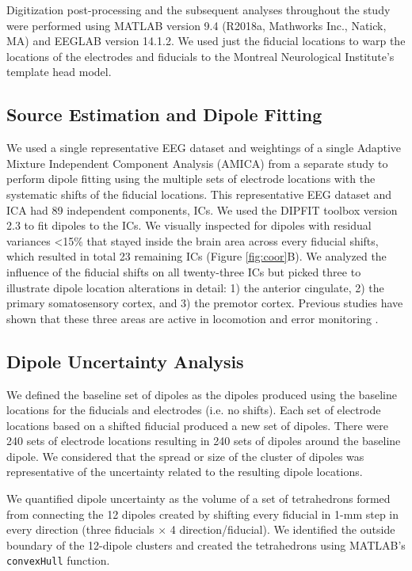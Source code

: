 \documentclass{UCF_ETD}
\begin{document}
Digitization post-processing and the subsequent analyses throughout the study were performed using MATLAB version 9.4 (R2018a, Mathworks Inc., Natick, MA) and EEGLAB \cite{Delorme2004-yy} version 14.1.2. We used just the fiducial locations to warp the locations of the electrodes and fiducials to the Montreal Neurological Institute's template head model.

\subsection{Source Estimation and Dipole Fitting}
We used a single representative EEG dataset and weightings of a single Adaptive Mixture Independent Component Analysis (AMICA) from a separate study to perform dipole fitting using the multiple sets of electrode locations with the systematic shifts of the fiducial locations. This representative EEG dataset and ICA had 89 independent components, ICs. We used the DIPFIT toolbox version 2.3 to fit dipoles to the ICs. We visually inspected for dipoles with residual variances <15\% that stayed inside the brain area across every fiducial shifts, which resulted in total 23 remaining ICs (Figure \ref{fig:coor}B). We analyzed the influence of the fiducial shifts on all twenty-three ICs but picked three to illustrate dipole location alterations in detail: 1) the anterior cingulate, 2) the primary somatosensory cortex, and 3) the premotor cortex. Previous studies have shown that these three areas are active in locomotion and error monitoring \cite{Luu2017-ph,Peterson2018-ht}.

\subsection{Dipole Uncertainty Analysis}
We defined the baseline set of dipoles as the dipoles produced using the baseline locations for the fiducials and electrodes (i.e. no shifts). Each set of electrode locations based on a shifted fiducial produced a new set of dipoles. There were 240 sets of electrode locations resulting in 240 sets of dipoles around the baseline dipole. We considered that the spread or size of the cluster of dipoles was representative of the uncertainty related to the resulting dipole locations.

We quantified dipole uncertainty as the volume of a set of tetrahedrons formed from connecting the 12 dipoles created by shifting every fiducial in 1-mm step in every direction (three fiducials $\times$ 4 direction/fiducial). We identified the outside boundary of the 12-dipole clusters and created the tetrahedrons using MATLAB's {\tt convexHull} function.
\end{document}
